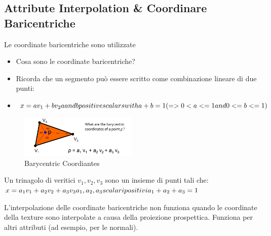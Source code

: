 \subsection{Attribute Interpolation \& Coordinare Baricentriche}
Le coordinate baricentriche sono utilizzate
\begin{itemize}
    \item Cosa sono le coordinate baricentriche?
    \item Ricorda che un segmento può essere scritto come combinazione lineare di due punti:
    \item $ x=av_1 + bv_2 \\ a and b positive scalars with a + b = 1 \\ (=> 0 < a <= 1 and 0 <= b <= 1)$
    
\end{itemize}
\begin{figure}[H]
    \centering
    \includegraphics[width=0.5\textwidth]{images/Baric.png} 
    \caption{Barycentric Coordiantes}
    \label{fig:immagine}
\end{figure}
Un trinagolo di veritici $v_1,v_2,v_3 $ sono un insieme di punti tali che:\\ 
$x=a_1v_1+a_2v_2+a_3v_3 \\
\vspace{10pt} 
a_1,a_2,a_3 scalari positivi \\
\vspace{10pt} 
a_1+a_2+a_3=1 \\  $

L'interpolazione delle coordinate baricentriche non funziona quando le coordinate della texture sono interpolate a causa della proiezione prospettica. 
Funziona per altri attributi (ad esempio, per le normali).

